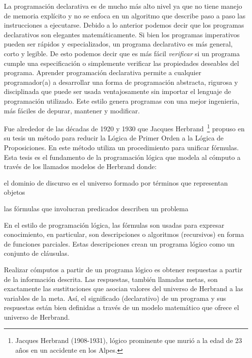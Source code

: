 \documentclass[11pt,letterpaper]{article}
\begin{document}

La programación declarativa es de mucho m\'as alto nivel ya que no tiene manejo 
de memoria expl\'icito y no se enfoca en un algoritmo que describe paso a paso 
las instrucciones a ejecutarse.
Debido a lo anterior podemos decir que los programas declarativos son 
elegantes matemáticamente.
Si bien los programas imperativos pueden ser rápidos y especializados, un 
programa declarativo es más general, corto y legible. 
De esto podemos decir que es más fácil \textit{verificar} si un programa cumple 
una especificación o simplemente verificar las propiedades deseables del programa.
Aprender programación declarativa permite a cualquier programador(a) a 
desarrollar una forma de programación abstracta, rigurosa y disciplinada que puede ser usada ventajosamente sin importar el lenguaje de programación utilizado.
Este estilo genera programas con una mejor ingenieria, más f\'aciles de 
depurar, mantener y modificar.

\bigskip

Fue alrededor de las d\'ecadas de 1920 y 1930 que Jacques 
Herbrand~\footnote{Jacques Herbrand (1908-1931), l\'ogico prominente que 
muri\'o a la edad de 23 años en un accidente en los Alpes.} propuso en 
su tesis un m\'etodo para reducir la L\'ogica de Primer Orden a la L\'ogica de Proposiciones. En este m\'etodo utiliza un procedimiento para unificar f\'ormulas.
Esta tesis es el fundamento de la programaci\'on l\'ogica que modela al 
c\'omputo a trav\'es de los llamados modelos de Herbrand donde:
\be
\item el dominio de discurso es el universo formado por t\'erminos que representan objetos
\item las f\'ormulas que involucran predicados describen un problema
\ee

En el estilo de programaci\'on l\'ogica, las f\'ormulas son usadas para expresar conocimiento, en particular, son descripciones o algoritmos (recursivos) 
en forma de funciones parciales. Estas descripciones crean un programa l\'ogico
como un conjunto de cl\'ausulas.

Realizar c\'omputos a partir de un programa l\'ogico es obtener respuestas a 
partir de la informaci\'on descrita. 
Las respuestas, tambi\'en llamadas metas, son exactamente las sustituciones que 
asocian valores del universo de Herbrand a las variables de la meta.
As\'i, el significado (declarativo) de un programa y sus respuestas est\'an bien 
definidas a trav\'es de un modelo matem\'atico que ofrece el universo de 
Herbrand.
\end{document}
